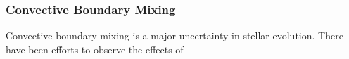 {\color{purple}
\subsubsection{Convective Boundary Mixing}
}

Convective boundary mixing is a major uncertainty in stellar evolution. There have been efforts to observe the effects of 

